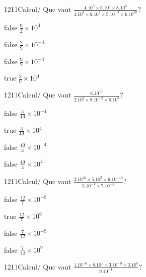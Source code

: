             \begin{question}{1211}{Calcul}{}{/}
                Que vaut $\frac{4.10^{9}\times 5.10^{4}\times 8.10^{3}}{4.10^{4}\times 6.10^{2}\times 5.10^{-4}\times 6.10^{10}}$?
            \end{question}
            \begin{reponses}
                \item[false] $\frac{9}{2}\times 10^{4}$
                \item[false] $\frac{2}{9}\times 10^{-4}$
                \item[false] $\frac{9}{2}\times 10^{-4}$
                \item[true] $\frac{2}{9}\times 10^{4}$
            \end{reponses}
            \begin{question}{1211}{Calcul}{}{/}
                Que vaut $\frac{6.10^{10}}{2.10^{2}\times 8.10^{-2}\times 5.10^{6}}$?
            \end{question}
            \begin{reponses}
                \item[false] $\frac{3}{40}\times 10^{-4}$
                \item[true] $\frac{3}{40}\times 10^{4}$
                \item[false] $\frac{40}{3}\times 10^{-4}$
                \item[false] $\frac{40}{3}\times 10^{4}$
            \end{reponses}
            \begin{question}{1211}{Calcul}{}{/}
                Que vaut $\frac{2.10^{10}\times 5.10^{2}\times 6.10^{-10}}{5.10^{-2}\times 7.10^{-5}}$?
            \end{question}
            \begin{reponses}
                \item[false] $\frac{12}{7}\times 10^{-9}$
                \item[true] $\frac{12}{7}\times 10^{9}$
                \item[false] $\frac{7}{12}\times 10^{-9}$
                \item[false] $\frac{7}{12}\times 10^{9}$
            \end{reponses}
            \begin{question}{1211}{Calcul}{}{/}
                Que vaut $\frac{1.10^{-6}\times 8.10^{1}\times 3.10^{-9}\times 3.10^{8}}{9.10^{-1}}$?
            \end{question}
